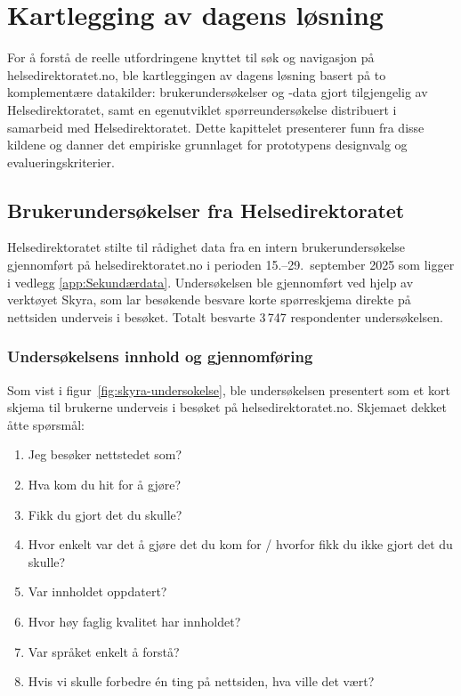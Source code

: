 \section{Kartlegging av dagens løsning}
\label{sec:baseline}

For å forstå de reelle utfordringene knyttet til søk og navigasjon på helsedirektoratet.no, ble kartleggingen av dagens løsning basert på to komplementære datakilder: brukerundersøkelser og -data gjort tilgjengelig av Helsedirektoratet, samt en egenutviklet spørreundersøkelse distribuert i samarbeid med Helsedirektoratet. Dette kapittelet presenterer funn fra disse kildene og danner det empiriske grunnlaget for prototypens designvalg og evalueringskriterier.

\subsection{Brukerundersøkelser fra Helsedirektoratet}
\label{sec:brukerundersokelser}

Helsedirektoratet stilte til rådighet data fra en intern brukerundersøkelse gjennomført på helsedirektoratet.no i perioden 15.–29.\ september 2025 som ligger i vedlegg \autoref{app:Sekundærdata}. Undersøkelsen ble gjennomført ved hjelp av verktøyet Skyra, som lar besøkende besvare korte spørreskjema direkte på nettsiden underveis i besøket. Totalt besvarte 3\,747 respondenter undersøkelsen.

\subsubsection{Undersøkelsens innhold og gjennomføring}
\label{sec:skyra-undersokelse}

Som vist i figur~\ref{fig:skyra-undersokelse}, ble undersøkelsen presentert som et kort skjema til brukerne underveis i besøket på helsedirektoratet.no. Skjemaet dekket åtte spørsmål:

\begin{enumerate}
    \item Jeg besøker nettstedet som?
    \item Hva kom du hit for å gjøre?
    \item Fikk du gjort det du skulle?
    \item Hvor enkelt var det å gjøre det du kom for / hvorfor fikk du ikke gjort det du skulle?
    \item Var innholdet oppdatert?
    \item Hvor høy faglig kvalitet har innholdet?
    \item Var språket enkelt å forstå?
    \item Hvis vi skulle forbedre én ting på nettsiden, hva ville det vært?
\end{enumerate}




